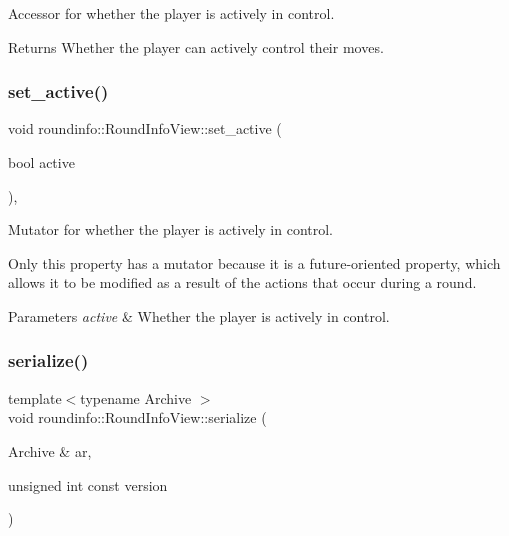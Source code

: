 Accessor for whether the player is actively in control. 

\begin{DoxyReturn}{Returns}
Whether the player can actively control their moves. 
\end{DoxyReturn}
\mbox{\label{classroundinfo_1_1_round_info_view_a5225bbd75931d1f5235e83d13b726927}} 
\subsubsection{\texorpdfstring{set\+\_\+active()}{set\_active()}}
{\footnotesize\ttfamily void roundinfo\+::\+Round\+Info\+View\+::set\+\_\+active (\begin{DoxyParamCaption}\item[{bool}]{active }\end{DoxyParamCaption})\hspace{0.3cm}{\ttfamily [inline]}, {\ttfamily [noexcept]}}



Mutator for whether the player is actively in control. 

Only this property has a mutator because it is a future-\/oriented property, which allows it to be modified as a result of the actions that occur during a round. 
\begin{DoxyParams}{Parameters}
{\em active} & Whether the player is actively in control. \\
\hline
\end{DoxyParams}
\mbox{\label{classroundinfo_1_1_round_info_view_a101e6ee624aacfa8dd110aea67e67538}} 
\subsubsection{\texorpdfstring{serialize()}{serialize()}}
{\footnotesize\ttfamily template$<$typename Archive $>$ \\
void roundinfo\+::\+Round\+Info\+View\+::serialize (\begin{DoxyParamCaption}\item[{Archive \&}]{ar,  }\item[{unsigned int const}]{version }\end{DoxyParamCaption})}



